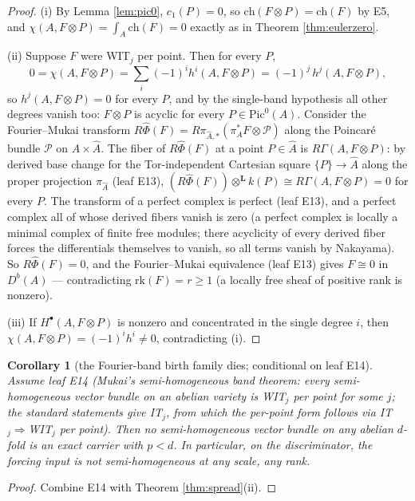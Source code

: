 \documentclass[11pt]{article}
\newtheorem{corollary}{Corollary}
\begin{document}
\begin{proof}
(i) By Lemma \ref{lem:pic0}, $c_1(P)=0$, so $\mathrm{ch}(F\otimes P)=\mathrm{ch}(F)$ by E5, and
$\chi(A,F\otimes P)=\int_A\mathrm{ch}(F)=0$ exactly as in Theorem \ref{thm:eulerzero}.

(ii) Suppose $F$ were WIT$_j$ per point. Then for every $P$,
\[
0=\chi(A,F\otimes P)=\sum_i(-1)^i h^i(A,F\otimes P)=(-1)^j\,h^j(A,F\otimes P),
\]
so $h^j(A,F\otimes P)=0$ for every $P$, and by the single-band hypothesis all other degrees vanish too:
$F\otimes P$ is acyclic for every $P\in\mathrm{Pic}^0(A)$. Consider the Fourier--Mukai transform
$R\widehat\Phi(F)=R\pi_{\hat A,*}(\pi_A^\ast F\otimes\mathcal{P})$ along the Poincar\'e bundle
$\mathcal{P}$ on $A\times\hat A$. The fiber of $R\widehat\Phi(F)$ at a point $P\in\hat A$ is
$R\Gamma(A,F\otimes P)$: by derived base change for the Tor-independent Cartesian square
$\{P\}\to\hat A$ along the proper projection $\pi_{\hat A}$ (leaf E13),
$(R\widehat\Phi(F))\otimes^{\mathbf{L}}k(P)\cong R\Gamma(A,F\otimes P)=0$ for every $P$. The transform of
a perfect complex is perfect (leaf E13), and a perfect complex all of whose derived fibers vanish is zero
(a perfect complex is locally a minimal complex of finite free modules; there acyclicity of every
derived fiber forces the differentials themselves to vanish, so all terms vanish by Nakayama).
So $R\widehat\Phi(F)=0$, and the Fourier--Mukai equivalence (leaf E13) gives $F\cong0$ in
$D^b(A)$ --- contradicting $\mathrm{rk}(F)=r\ge1$ (a locally free sheaf of positive rank is nonzero).

(iii) If $H^\bullet(A,F\otimes P)$ is nonzero and concentrated in the single degree $i$, then
$\chi(A,F\otimes P)=(-1)^i h^i\ne0$, contradicting (i).
\end{proof}

\begin{corollary}[the Fourier-band birth family dies; conditional on leaf E14]\label{cor:semihom}
Assume leaf E14 (Mukai's semi-homogeneous band theorem: every semi-homogeneous vector bundle on an
abelian variety is WIT$_j$ per point for some $j$; the standard statements give IT$_j$, from which the
per-point form follows via IT$_j\Rightarrow$WIT$_j$ per point). Then no semi-homogeneous vector bundle on any
abelian $d$-fold is an exact carrier with $p<d$. In particular, on the discriminator, the forcing input
is not semi-homogeneous at any scale, any rank.
\end{corollary}

\begin{proof}
Combine E14 with Theorem \ref{thm:spread}(ii).
\end{proof}
\end{document}
